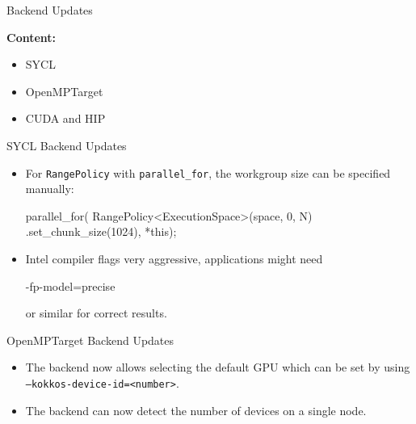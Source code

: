 

\begin{frame}[fragile]

  {\Huge Backend Updates}

  \vspace{10pt}

  \textbf{Content:}
  \begin{itemize}
    \item SYCL
    \item OpenMPTarget
    \item CUDA and HIP
  \end{itemize}

\end{frame}


\begin{frame}[fragile]{SYCL Backend Updates}
\begin{itemize}
\item For \texttt{RangePolicy} with \texttt{parallel\_for}, the workgroup size can be specified manually:
\begin{code}
parallel_for(
  RangePolicy<ExecutionSpace>(space, 0, N)
    .set_chunk_size(1024), *this);
\end{code}

\item Intel compiler flags very aggressive, applications might need
\begin{code}
-fp-model=precise
\end{code}

or similar for correct results.
\end{itemize}
\end{frame}



\begin{frame}[fragile]{OpenMPTarget Backend Updates}

    \begin{itemize}
        \item The backend now allows selecting the default GPU which can be set by using \texttt{--kokkos-device-id=<number>}. 
        \item The backend can now detect the number of devices on a single node. 
    \end{itemize}
    
\end{frame}
 
